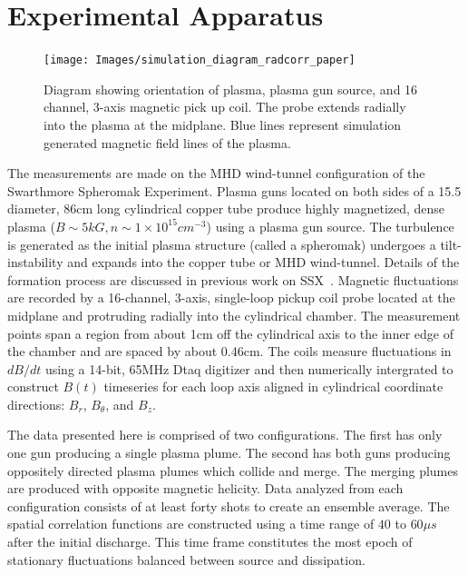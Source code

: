 \documentclass[aip,prl,amsmath,amssymb,reprint,superscriptaddress]{revtex4-1} %
\begin{document}
\section{Experimental Apparatus}

\begin{figure}[!htbp]
\centerline{
\texttt{[image: Images/simulation\_diagram\_radcorr\_paper]}}
\caption{\label{fig:chamber} Diagram showing orientation of plasma, plasma gun source, and 16 channel, 3-axis magnetic pick up coil. The probe extends radially into the plasma at the midplane. Blue lines represent simulation generated magnetic field lines of the plasma.}
\end{figure}

The measurements are made on the MHD wind-tunnel configuration of the Swarthmore Spheromak Experiment. Plasma guns located on both sides of a 15.5 diameter, 86cm long cylindrical copper tube produce highly magnetized, dense plasma ($B\sim 5kG, n\sim 1\times 10^{15} cm^{-3}$) using a plasma gun source. The turbulence is generated as the initial plasma structure (called a spheromak) undergoes a tilt-instability and expands into the copper tube or MHD wind-tunnel. Details of the formation process are discussed in previous work on SSX~\cite{schaffner14a,schaffner14b}. Magnetic fluctuations are recorded by a 16-channel, 3-axis, single-loop pickup coil probe located at the midplane and protruding radially into the cylindrical chamber. The measurement points span a region from about 1cm off the cylindrical axis to the inner edge of the chamber and are spaced by about 0.46cm. The coils measure fluctuations in $dB/dt$ using a 14-bit, 65MHz Dtaq digitizer and then numerically intergrated to construct $B(t)$ timeseries for each loop axis aligned in cylindrical coordinate directions: $B_{r}$, $B_{\theta}$, and $B_{z}$.

The data presented here is comprised of two configurations. The first has only one gun producing a single plasma plume. The second has both guns producing oppositely directed plasma plumes which collide and merge. The merging plumes are produced with opposite magnetic helicity. Data analyzed from each configuration consists of at least forty shots to create an ensemble average. The spatial correlation functions are constructed using a time range of $40$ to $60\mu s$ after the initial discharge. This time frame constitutes the most epoch of stationary fluctuations balanced between source and dissipation. 
\end{document}
